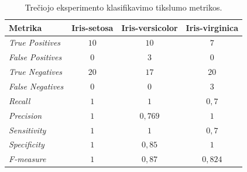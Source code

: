 \begin{table}[H]
    \centering
    \caption{Trečiojo eksperimento klasifikavimo tikslumo metrikos.}
    \begin{tabular}{|l|c|c|c|}
        \hline
        \textbf{Metrika} & \textbf{Iris-setosa} & \textbf{Iris-versicolor} & \textbf{Iris-virginica} \\
        \hline
        \textit{True Positives}   & $10$  & $10$  & $7$ \\ \hline
        \textit{False Positives}  & $0$  & $3$   & $0$  \\ \hline
        \textit{True Negatives}   & $20$ & $17$  & $20$ \\ \hline
        \textit{False Negatives}  & $0$  & $0$   & $3$  \\ \hline
        \textit{Recall}           & $1$  & $1$       & $0{,}7$ \\ \hline
        \textit{Precision}        & $1$  & $0{,}769$ & $1$ \\ \hline
        \textit{Sensitivity}      & $1$  & $1$       & $0{,}7$ \\ \hline
        \textit{Specificity}      & $1$  & $0{,}85$ & $1$ \\ \hline
        \textit{F-measure}        & $1$  & $0{,}87$ & $0{,}824$ \\ \hline
    \end{tabular}
    \label{tab:eksperimento_nr_3_klasifikavimo_metrikos}
\end{table}